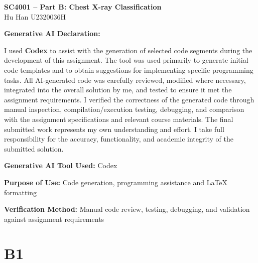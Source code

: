 \documentclass[10pt,a4paper]{article}
\begin{document}
\begin{center}{\large\bfseries SC4001 -- Part B: Chest X-ray Classification}\\Hu Han \quad U2320036H\end{center}

\textbf{Generative AI Declaration:}

I used \textbf{Codex} to assist with the generation of selected code segments during the development of this assignment. The tool was used primarily to generate initial code templates and to obtain suggestions for implementing specific programming tasks. All AI-generated code was carefully reviewed, modified where necessary, integrated into the overall solution by me, and tested to ensure it met the assignment requirements. I verified the correctness of the generated code through manual inspection, compilation/execution testing, debugging, and comparison with the assignment specifications and relevant course materials. The final submitted work represents my own understanding and effort. I take full responsibility for the accuracy, functionality, and academic integrity of the submitted solution.

\textbf{Generative AI Tool Used:} Codex

\textbf{Purpose of Use:} Code generation, programming assistance and LaTeX formatting

\textbf{Verification Method:} Manual code review, testing, debugging, and validation against assignment requirements

\section*{B1}
\end{document}
